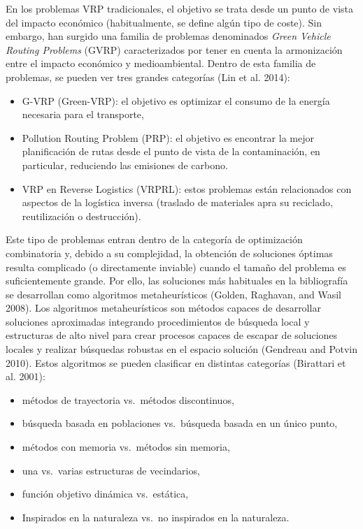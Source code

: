 \documentclass[
]{article}
\providecommand{\tightlist}{%
  \setlength{\itemsep}{0pt}\setlength{\parskip}{0pt}}
\begin{document}
En los problemas VRP tradicionales, el objetivo se trata desde un punto
de vista del impacto económico (habitualmente, se define algún tipo de
coste). Sin embargo, han surgido una familia de problemas denominados
\emph{Green Vehicle Routing Problems} (GVRP) caracterizados por tener en
cuenta la armonización entre el impacto económico y medioambiental.
Dentro de esta familia de problemas, se pueden ver tres grandes
categorías (Lin et al. 2014):

\begin{itemize}
\tightlist
\item
  G-VRP (Green-VRP): el objetivo es optimizar el consumo de la energía
  necesaria para el transporte,
\item
  Pollution Routing Problem (PRP): el objetivo es encontrar la mejor
  planificación de rutas desde el punto de vista de la contaminación, en
  particular, reduciendo las emisiones de carbono.
\item
  VRP en Reverse Logistics (VRPRL): estos problemas están relacionados
  con aspectos de la logística inversa (traslado de materiales apra su
  reciclado, reutilización o destrucción).
\end{itemize}

Este tipo de problemas entran dentro de la categoría de optimización
combinatoria y, debido a su complejidad, la obtención de soluciones
óptimas resulta complicado (o directamente inviable) cuando el tamaño
del problema es suficientemente grande. Por ello, las soluciones más
habituales en la bibliografía se desarrollan como algoritmos
metaheurísticos (Golden, Raghavan, and Wasil 2008). Los algoritmos
metaheurísticos son métodos capaces de desarrollar soluciones
aproximadas integrando procedimientos de búsqueda local y estructuras de
alto nivel para crear procesos capaces de escapar de soluciones locales
y realizar búsquedas robustas en el espacio solución (Gendreau and
Potvin 2010). Estos algoritmos se pueden clasificar en distintas
categorías (Birattari et al. 2001):

\begin{itemize}
\tightlist
\item
  métodos de trayectoria vs.~métodos discontinuos,
\item
  búsqueda basada en poblaciones vs.~búsqueda basada en un único punto,
\item
  métodos con memoria vs.~métodos sin memoria,
\item
  una vs.~varias estructuras de vecindarios,
\item
  función objetivo dinámica vs.~estática,
\item
  Inspirados en la naturaleza vs.~no inspirados en la naturaleza.
\end{itemize}
\end{document}

